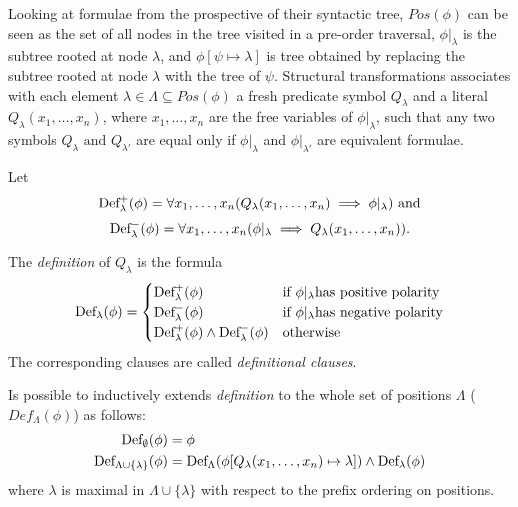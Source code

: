 Looking at formulae from the prospective of their syntactic tree, \(Pos(\phi)\) can be seen as the set of all nodes in the tree visited in a pre-order traversal, \(\phi|_\lambda\) is the subtree rooted at node \(\lambda\), and \(\phi[\psi\mapsto\lambda]\) is tree obtained by replacing the subtree rooted at node \(\lambda\) with the tree of \(\psi\).
Structural transformations associates with each element \(\lambda \in \Lambda \subseteq Pos(\phi)\) a fresh predicate symbol \(Q_\lambda\) and a literal \(Q_\lambda(x_1,\ldots,x_n)\), where \(x_1,\ldots,x_n\) are the free variables of \(\phi|_\lambda\), such that any two symbols \(Q_\lambda \text{ and } Q_{\lambda'}\) are equal only if \(\phi|_\lambda\) and \(\phi|_{\lambda'}\) are equivalent formulae.

Let 
  \[\fldef{\lambda}[+]{\phi} = \forall x_1, \ldots, x_n(Q_\lambda(x_1,\ldots,x_n)\implies \phi|_\lambda) \text{ and}\]
  \[\fldef{\lambda}[-]{\phi} = \forall x_1, \ldots, x_n(\phi|_\lambda \implies Q_\lambda(x_1,\ldots,x_n)).\]

The \emph{definition} of \(Q_\lambda\) is the formula
\begin{equation}
  \fldef{\lambda}{\phi} = \begin{cases}
                        \fldef{\lambda}[+]{\phi} & \text{if } \phi|_\lambda \text{has positive polarity}\\
                        \fldef{\lambda}[-]{\phi} & \text{if } \phi|_\lambda \text{has negative polarity}\\
                        \fldef{\lambda}[+]{\phi} \land \fldef{\lambda}[-]{\phi} & \text{otherwise}
                      \end{cases}
\end{equation}
The corresponding clauses are called \emph{definitional clauses}.

Is possible to inductively extends \emph{definition} to the whole set of positions \(\Lambda\) (\(Def_\Lambda(\phi)\)) as follows:
\begin{equation}
  \begin{aligned}
    \fldef{\emptyset}{\phi} &= \phi\\
    \fldef{\Lambda\cup\{\lambda\}}{\phi} &= \fldef{\Lambda}{\phi[Q_\lambda(x_1,\ldots,x_n)\mapsto\lambda]} \land \fldef{\lambda}{\phi}
  \end{aligned}
\end{equation}
where \(\lambda\) is maximal in \(\Lambda\cup\{\lambda\}\) with respect to the prefix ordering on positions.

